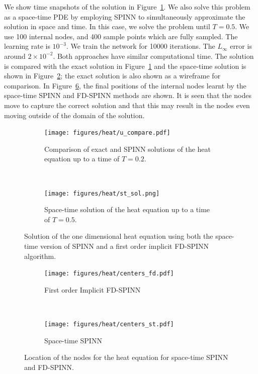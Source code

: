 \documentclass[12pt]{article}
\newcommand{\rr}[1]{#1}
\newcommand{\rb}[1]{#1}
\begin{document}
We show time snapshots of the solution in Figure~\ref{fig:heat_eqn_compare}. We also solve this problem as a space-time PDE by employing SPINN to simultaneously approximate the solution in space and time.  \rb{In this case, we solve the problem until $T=0.5$.  We use 100 internal nodes, and 400 sample points which are fully sampled. The learning rate is $10^{-3}$. We train the network for 10000 iterations.}  \rr{The $L_{\infty}$ error is around $2 \times 10^{-2}$.  Both approaches have similar computational time.} The solution is compared with the exact solution in Figure~\ref{fig:heat_eqn_compare} and the space-time solution is shown in Figure~\ref{fig:heat_eqn_st_sol}; the exact solution is also shown as a wireframe for comparison. In Figure~\ref{fig:heat_nodes}, the final positions of the internal nodes learnt by the space-time SPINN and FD-SPINN methods are shown. \rb{It is seen that the nodes move to capture the correct solution and that this may result in the nodes even moving outside of the domain of the solution.}

\begin{figure}
\begin{subfigure}{0.5\textwidth}
\texttt{[image: figures/heat/u\_compare.pdf]}
\caption{Comparison of exact and SPINN solutions of the heat equation \rb{up to a time of $T=0.2$}.}
\label{fig:heat_eqn_compare}
\end{subfigure}
~
\begin{subfigure}{0.5\textwidth}
\texttt{[image: figures/heat/st\_sol.png]}
\caption{Space-time solution of the heat equation \rb{up to a time of $T=0.5$}.}
\label{fig:heat_eqn_st_sol}
\end{subfigure}
\caption{Solution of the one dimensional heat equation using both the space-time version of SPINN and a first order implicit FD-SPINN algorithm.}
\label{fig:heat_eqn}
\end{figure}

\begin{figure}
\begin{subfigure}{0.45\textwidth}
\centering
\texttt{[image: figures/heat/centers\_fd.pdf]}
\caption{First order Implicit FD-SPINN}
\label{fig:heat_fdnodes}
\end{subfigure}
~
\begin{subfigure}{0.45\textwidth}
\centering
\texttt{[image: figures/heat/centers\_st.pdf]}
\caption{Space-time SPINN}
\label{fig:heat_st_nodes}
\end{subfigure}
\caption{Location of the nodes for the heat equation for space-time SPINN and FD-SPINN.}
\label{fig:heat_nodes}
\end{figure}
\end{document}
